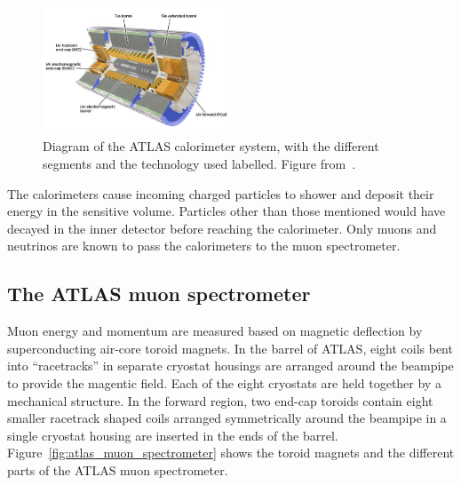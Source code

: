 \begin{figure}
    \centering
    \includegraphics[width = 0.5\textwidth]{figures/calorimeter.png}
    \caption{Diagram of the ATLAS calorimeter system, with the different segments and the technology used labelled. Figure from~\cite{collaboration_atlas_2008}.}
    \label{fig:atlas_calorimeter}
\end{figure}

The calorimeters cause incoming charged particles to shower and deposit their energy in the sensitive volume. Particles other than those mentioned would have decayed in the inner detector before reaching the calorimeter. Only muons and neutrinos are known to pass the calorimeters to the muon spectrometer. 

\subsection{The ATLAS muon spectrometer}

Muon energy and momentum are measured based on magnetic deflection by superconducting air-core toroid magnets. In the barrel of ATLAS, eight coils bent into ``racetracks'' in separate cryostat housings are arranged around the beampipe to provide the magentic field. Each of the eight cryostats are held together by a mechanical structure. In the forward region, two end-cap toroids contain eight smaller racetrack shaped coils arranged symmetrically around the beampipe in a single cryostat housing are inserted in the ends of the barrel. Figure~\ref{fig:atlas_muon_spectrometer} shows the toroid magnets and the different parts of the ATLAS muon spectrometer.

